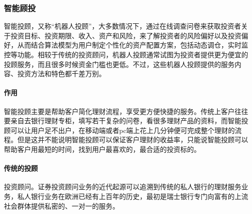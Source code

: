 \documentclass[letterpaper,10pt,english]{sphinxmanual}
\begin{document}
\subsubsection{智能顾投}
\label{\detokenize{chapter_AI+Finance/Robo-Advisor:id1}}\label{\detokenize{chapter_AI+Finance/Robo-Advisor::doc}}
智能投顾，又称“机器人投顾”，大多数情况下，通过在线调查问卷来获取投资者关于投资目标、投资期限、收入、资产和风险，来了解投资者的风险偏好以及投资偏好，从而结合算法模型为用户制定个性化的资产配置方案，包括动态调仓，实时监控等功能。相较于传统的投资顾问，机器人投顾通常试图为投资者提供更为便宜的投顾服务，而且很多时候资金门槛也更低。不过，这些机器人投顾提供的服务内容、投资方法和特色都千差万别。
%
\begin{footnote}[1104]\sphinxAtStartFootnote
{}
%
\end{footnote}


\paragraph{作用}
\label{\detokenize{chapter_AI+Finance/Robo-Advisor:id2}}
智能投顾主要是帮助客户简化理财流程，享受更方便快捷的服务。传统上客户往往要亲自去银行理财专柜，填写若干复杂的问卷，看很多理财产品的资料，而智能投顾可以让用户足不出户，在移动端或者pc端上花上几分钟便可完成整个理财的流程。但是这并不能说明智能投顾可以保证客户理财的收益率，只能说智能投顾可以帮助客户用最短的时间，找到用户最喜欢的，最合适的投资标的。


\paragraph{传统的投顾}
\label{\detokenize{chapter_AI+Finance/Robo-Advisor:id3}}
投资顾问。证券投资顾问业务的近代起源可以追溯到传统的私人银行的理财服务业务，私人银行业务在欧洲已经有上百年的历史，最初是瑞士银行专门向富有的上流社会群体提供私密的、一对一的服务。%
\begin{footnote}[1105]\sphinxAtStartFootnote
{}
%
\end{footnote}
\end{document}
